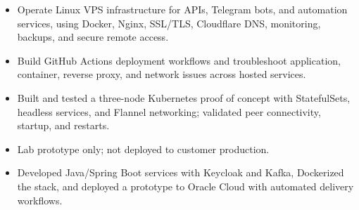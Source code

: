\begin{itemize}
\item Operate Linux VPS infrastructure for APIs, Telegram bots, and automation services,
using Docker, Nginx, SSL/TLS, Cloudflare DNS, monitoring, backups, and secure remote access.
\item Build GitHub Actions deployment workflows and troubleshoot application, container,
reverse proxy, and network issues across hosted services.
\end{itemize}
\begin{itemize}
\item Built and tested a three-node Kubernetes proof of concept with StatefulSets,
headless services, and Flannel networking; validated peer connectivity, startup, and restarts.
\item Lab prototype only; not deployed to customer production.
\end{itemize}
\begin{itemize}
\item Developed Java/Spring Boot services with Keycloak and Kafka, Dockerized the stack,
and deployed a prototype to Oracle Cloud with automated delivery workflows.
\end{itemize}
